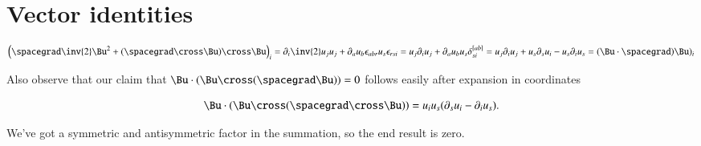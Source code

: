 \label{chap:appendix:constantSpinSurfaces}
\section{Vector identities}

\DMATH
\begin{dmath}\label{eqn:constantSpinSurfaces:170}
\left( \spacegrad \inv{2} \Bu^2 + (\spacegrad \cross \Bu) \cross \Bu \right)_i
=
\partial_i \inv{2} u_j u_j + \partial_a u_b \epsilon_{a b r} u_s \epsilon_{r s i} 
=
u_j \partial_i u_j + \partial_a u_b u_s \delta^{[a b]}_{s i} 
=
u_j \partial_i u_j 
+ u_s \partial_s u_i 
- u_s \partial_i u_s 
= (\Bu \cdot \spacegrad) \Bu)_i
\end{dmath}

Also observe that our claim that $\Bu \cdot (\Bu \cross (\spacegrad \Bu)) = 0$ follows easily after expansion in coordinates

\begin{equation}\label{eqn:constantSpinSurfaces:190}
\Bu \cdot (\Bu \cross (\spacegrad \cross \Bu) )
=
u_i u_s ( \partial_s u_i - \partial_i u_s ).
\end{equation}

We've got a symmetric and antisymmetric factor in the summation, so the end result is zero.


